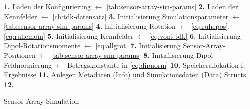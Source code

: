 \begin{algorithm}[hbp]
	\SetAlgoLined
	\textbf{1.} Laden der Konfigurierung $\leftarrow$ \autoref{tab:sensor-array-sim-params}\;
	\textbf{2.} Laden der Kennfelder $\leftarrow$ \autoref{ch:tdk-datensatz}\;
	\textbf{3.} Initialisierung Simulationsparameter $\leftarrow$ \autoref{tab:sensor-array-sim-params}\;
	\textbf{4.} Initialisierung Rotation $\leftarrow$ \autoref{eq:ruhepos}, \autoref{eq:ruhemom}\;
	\textbf{5.} Initialisierung Kennfelder $\leftarrow$ \autoref{eq:vout-tdk}\;
	\textbf{6.} Initialisierung Dipol-Rotationsmomente $\leftarrow$ \autoref{eq:allgrot}\;
	\textbf{7.} Initialisierung Sensor-Array-Positionen $\leftarrow$ \autoref{tab:sensor-array-sim-params}\;
	\textbf{8.} Initialisierung Dipol-Feldnormierung $\leftarrow$ Betragskonstante in \autoref{eq:dipnorm}\;
	\textbf{10.} Speicherallokation f. Ergebnisse\;
	\textbf{11.} Anlegen Metadaten (Info) und Simulationsdaten (Data) Structs\;
	\textbf{12.} 
	\caption{Sensor-Array-Simulation}
	\label{alg:sensor-array-sim}
\end{algorithm}


\clearpage


